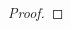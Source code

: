 \documentclass[11pt]{article}
\begin{document}
\begin{CJK*}{UTF8}{gbsn}
\begin{proof}
\end{proof} 





\end{CJK*}
\end{document}
